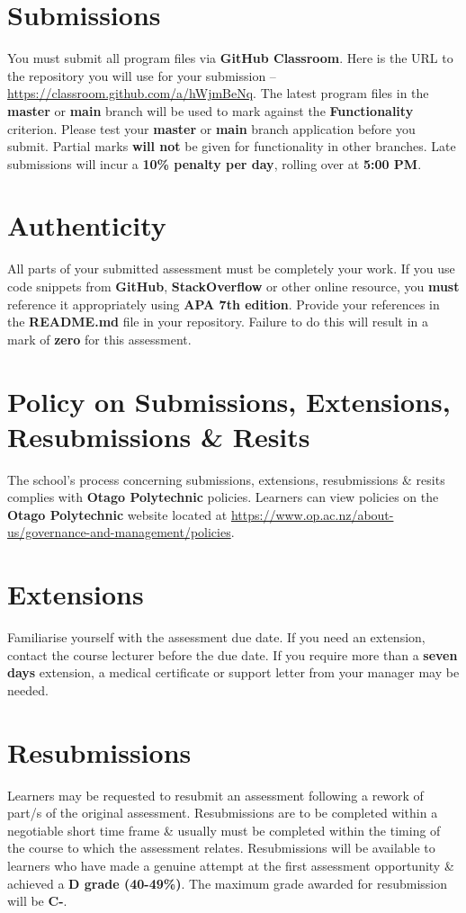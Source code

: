 \documentclass{article}
\begin{document}
\section*{Submissions}
You must submit all program files via \textbf{GitHub Classroom}. Here is the URL to the repository you will use for your submission – \href{https://classroom.github.com/a/hWjmBeNq}{https://classroom.github.com/a/hWjmBeNq}. The latest program files in the \textbf{master} or \textbf{main} branch will be used to mark against the \textbf{Functionality} criterion. Please test your \textbf{master} or \textbf{main} branch application before you submit. Partial marks \textbf{will not} be given for functionality in other branches. Late submissions will incur a \textbf{10\% penalty per day}, rolling over at \textbf{5:00 PM}.

\section*{Authenticity}
All parts of your submitted assessment must be completely your work. If you use code snippets from \textbf{GitHub}, \textbf{StackOverflow} or other online resource, you \textbf{must} reference it appropriately using \textbf{APA 7th edition}. Provide your references in the \textbf{README.md} file in your repository. Failure to do this will result in a mark of \textbf{zero} for this assessment.

\section*{Policy on Submissions, Extensions, Resubmissions \& Resits}
The school's process concerning submissions, extensions, resubmissions \& resits complies with \textbf{Otago Polytechnic} policies. Learners can view policies on the \textbf{Otago Polytechnic} website located at \href{https://www.op.ac.nz/about-us/governance-and-management/policies}{https://www.op.ac.nz/about-us/governance-and-management/policies}.

\section*{Extensions}
Familiarise yourself with the assessment due date. If you need an extension, contact the course lecturer before the due date. If you require more than a \textbf{seven days} extension, a medical certificate or support letter from your manager may be needed.

\section*{Resubmissions}
Learners may be requested to resubmit an assessment following a rework of part/s of the original assessment. Resubmissions are to be completed within a negotiable short time frame \& usually must be completed within the timing of the course to which the assessment relates. Resubmissions will be available to learners who have made a genuine attempt at the first assessment opportunity \& achieved a \textbf{D grade (40-49\%)}. The maximum grade awarded for resubmission will be \textbf{C-}.
\end{document}
